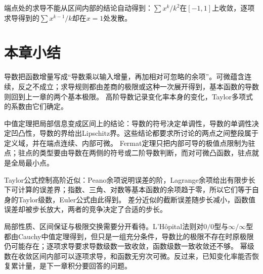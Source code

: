 端点处的求导不能从区间内部的结论自动得到：$\sum x^k/k^2$在$[-1,1]$上收敛，逐项求导得到的$\sum x^{k-1}/k$却在$x=1$处发散。

\FloatBarrier
\section{本章小结}
\label{sec:analysis-summary}

导数把函数增量写成“导数乘以输入增量，再加相对可忽略的余项”。可微蕴含连续，反之不成立；求导规则都由差商的极限或这种一次展开得到，基本函数的导数则回到上一章的两个基本极限。
高阶导数记录变化率本身的变化，Taylor多项式的系数由它们确定。

中值定理把局部信息变成区间上的结论：导数的符号决定单调性，导数的单调性决定凹凸性，导数的界给出Lipschitz界。这些结论都要求所讨论的两点之间整段属于定义域，并在端点连续、内部可微。
Fermat定理只把内部可导的极值点限制为驻点；驻点的类型要由导数在两侧的符号或二阶导数判断，而对可微凸函数，驻点就是全局最小点。

Taylor公式控制高阶近似：Peano余项说明误差的阶，Lagrange余项给出有限步长下可计算的误差界；指数、三角、对数等基本函数的余项趋于零，所以它们等于自身的Taylor级数，Euler公式由此得到。
差分近似的截断误差随步长减小，函数值误差却被步长放大，两者的竞争决定了合适的步长。

局部性质、区间保证与极限交换需要分开看待。L'Hôpital法则对$0/0$型与$\infty/\infty$型都由Cauchy中值定理得到，但只是一组充分条件，导数比的极限不存在时原极限仍可能存在；逐项求导要求导数级数一致收敛，函数级数一致收敛还不够。
幂级数在收敛区间内部可以逐项求导，和函数无穷次可微。反过来，已知变化率能否恢复累计量，是下一章积分要回答的问题。
